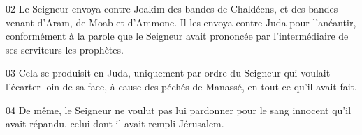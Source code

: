 
02 Le Seigneur envoya contre Joakim des bandes de Chaldéens, et des bandes venant d’Aram, de Moab et d’Ammone. Il les envoya contre Juda pour l’anéantir, conformément à la parole que le Seigneur avait prononcée par l’intermédiaire de ses serviteurs les prophètes.

03 Cela se produisit en Juda, uniquement par ordre du Seigneur qui voulait l’écarter loin de sa face, à cause des péchés de Manassé, en tout ce qu’il avait fait.

04 De même, le Seigneur ne voulut pas lui pardonner pour le sang innocent qu’il avait répandu, celui dont il avait rempli Jérusalem.
